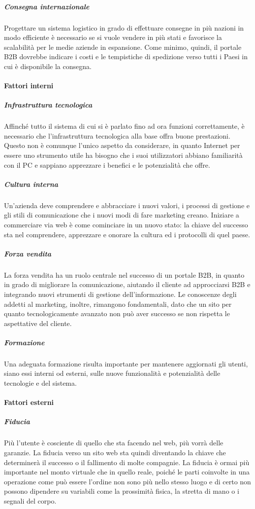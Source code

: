 \subparagraph{Consegna internazionale}
Progettare un sistema logistico in grado di effettuare consegne in più nazioni in modo efficiente è necessario se si vuole vendere in più stati e favorisce la scalabilità per le medie aziende in espansione. Come minimo, quindi, il portale B2B dovrebbe indicare i costi e le tempistiche di spedizione verso tutti i Paesi in cui è disponibile la consegna.

\paragraph{Fattori interni}
\subparagraph{Infrastruttura tecnologica}
Affinché tutto il sistema di cui si è parlato fino ad ora funzioni correttamente, è necessario che l'infrastruttura tecnologica alla base offra buone prestazioni. Questo non è comunque l'unico aspetto da considerare, in quanto Internet per essere uno strumento utile ha bisogno che i suoi utilizzatori abbiano familiarità con il PC e sappiano apprezzare i benefici e le potenzialità che offre.

\subparagraph{Cultura interna}
Un'azienda deve comprendere e abbracciare i nuovi valori, i processi di gestione e gli stili di comunicazione che i nuovi modi di fare marketing creano. Iniziare a commerciare via web è come cominciare in un nuovo stato: la chiave del successo sta nel comprendere, apprezzare e onorare la cultura ed i protocolli di quel paese.

\subparagraph{Forza vendita}
La forza vendita ha un ruolo centrale nel successo di un portale B2B, in quanto in grado di migliorare la comunicazione, aiutando il cliente ad approcciarsi B2B e integrando nuovi strumenti di gestione dell'informazione. Le conoscenze degli addetti al marketing, inoltre, rimangono fondamentali, dato che un sito per quanto tecnologicamente avanzato non può aver successo se non rispetta le aspettative del cliente.

\subparagraph{Formazione}
Una adeguata formazione risulta importante per mantenere aggiornati gli utenti, siano essi interni od esterni, sulle nuove funzionalità e potenzialità delle tecnologie e del sistema.

\paragraph{Fattori esterni}
\subparagraph{Fiducia}
Più l'utente è cosciente di quello che sta facendo nel web, più vorrà delle garanzie. La fiducia verso un sito web sta quindi diventando la chiave che determinerà il successo o il fallimento di molte compagnie. La fiducia è ormai più importante nel monto virtuale che in quello reale, poiché le parti coinvolte in una operazione come può essere l'ordine non sono più nello stesso luogo e di certo non possono dipendere su variabili come la prossimità fisica, la stretta di mano o i segnali del corpo.

